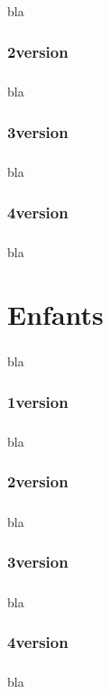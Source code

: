 \paragraph{}
bla

\subsection{2\ieme version}
\paragraph{}
bla

\subsection{3\ieme version}
\paragraph{}
bla

\subsection{4\ieme version}
\paragraph{}
bla

\chapter{Enfants}
\paragraph{}
bla

\subsection{1\ier version}
\paragraph{}
bla

\subsection{2\ieme version}
\paragraph{}
bla

\subsection{3\ieme version}
\paragraph{}
bla

\subsection{4\ieme version}
\paragraph{}
bla
